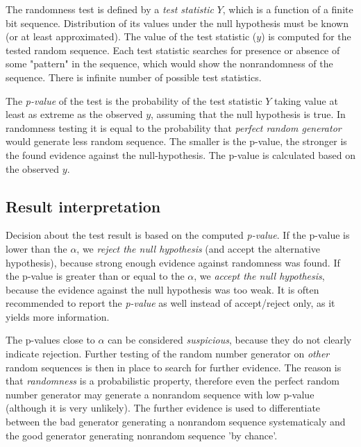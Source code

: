 \documentclass[
  digital,     %
  oneside,     %
  nosansbold,  %
  nocolorbold, %
  nolof,         %
  nolot,         %
]{fithesis4}
\begin{document}

The randomness test is defined by a \emph{test statistic} $Y$, which is a function of a finite bit sequence. Distribution of its values under the null hypothesis must be known (or at least approximated). The value of the test statistic ($y$) is computed for the tested random sequence. Each test statistic searches for presence or absence of some "pattern" in the sequence, which would show the nonrandomness of the sequence. There is infinite number of possible test statistics. \cite[p. 4]{tu01_paper}


The \emph{p-value} of the test is the probability of the test statistic $Y$ taking value at least as extreme as the observed $y$, assuming that the null hypothesis is true. In randomness testing it is equal to the probability that \emph{perfect random generator} would generate less random sequence. The smaller is the p-value, the stronger is the found evidence against the null-hypothesis. \cite[p. 386]{basic_practice} The p-value is calculated based on the observed $y$.



\subsection{Result interpretation} \label{chap:rand-interpretation}

Decision about the test result is based on the computed \emph{p-value}. If the p-value is lower than the $\alpha$, we \emph{reject the null hypothesis} (and accept the alternative hypothesis), because strong enough evidence against randomness was found. If the p-value is greater than or equal to the $\alpha$, we \emph{accept the null hypothesis}, because the evidence against the null hypothesis was too weak. \cite[p. 390]{basic_practice} It is often recommended to report the \emph{p-value} as well instead of accept/reject only, as it yields more information. \cite[p. 90]{tu01_guide}


The p-values close to $\alpha$ can be considered \emph{suspicious}, because they do not clearly indicate rejection. Further testing of the random number generator on \emph{other} random sequences is then in place to search for further evidence. \cite[p. 5]{tu01_paper} The reason is that \emph{randomness} is a probabilistic property, therefore even the perfect random number generator may generate a nonrandom sequence with low p-value (although it is very unlikely). The further evidence is used to differentiate between the bad generator generating a nonrandom sequence systematicaly and the good generator generating nonrandom sequence 'by chance'. \cite[p. 90]{tu01_guide}
\end{document}
